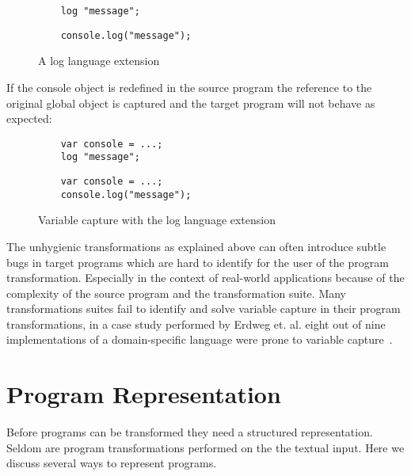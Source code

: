 \begin{figure}[!h]
\begin{minipage}{0.45\textwidth}
	\begin{lstlisting}
	log "message";
	\end{lstlisting}
\end{minipage}
\hfill
\begin{minipage}{0.45\textwidth}
	\begin{lstlisting}
	console.log("message");
	\end{lstlisting}
\end{minipage}
\caption{A log language extension}
\end{figure}

If the console object is redefined in the source program the reference to the original global object is captured and the target program will not behave as expected:

\begin{figure}[!h]
\begin{minipage}{0.45\textwidth}
	\begin{lstlisting}
	var console = ...;	
	log "message";
	\end{lstlisting}
\end{minipage}
\hfill
\begin{minipage}{0.45\textwidth}
	\begin{lstlisting}
	var console = ...;	
	console.log("message");
	\end{lstlisting}
\end{minipage}
\caption{Variable capture with the log language extension}
\end{figure}

The unhygienic transformations as explained above can often introduce subtle bugs in target programs which are hard to identify for the user of the program transformation. Especially in the context of real-world applications because of the complexity of the source program and the transformation suite. Many transformations suites fail to identify and solve variable capture in their program transformations, in a case study performed by Erdweg et. al. eight out of nine implementations of a domain-specific language were prone to variable capture~\cite{Erdweg2014a}.

\section{Program Representation} \label{program-representation}
Before programs can be transformed they need a structured representation. Seldom are program transformations performed on the the textual input. Here we discuss several ways to represent programs.

